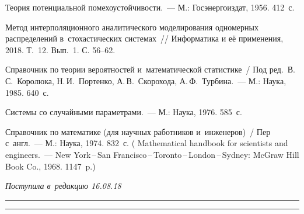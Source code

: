 \begin{multicols}{2}
{{\begin{thebibliography}{9}
Теория потенциальной помехоустойчивости.~--- М.: Госэнергоиздат, 1956. 412~с.

Метод интерполяционного аналитического моделирования одномерных распределений 
в~стохастических системах~// Информатика и её применения, 
2018. Т.~12. Вып.~1. С. 56--62.

\columnbreak

Справочник по теории вероятностей и~математической статистике~/ 
Под ред.\ В.\,С.~Королюка, Н.\,И.~Портенко, А.\,В.~Скорохода, А.\,Ф.~Турбина.~--- 
М.: Наука, 1985. 640~с.



Системы со случайными параметрами.~--- М.:
Наука,  1976.  585~с.


Справочник по  математике (для научных работников и~инженеров)~/
Пер с~англ.~--- 
М.: Наука, 1974. 832~с.
( 
Mathematical handbook for scientists and engineers.~--- 
New York\,--\,San Francisco\,--\,Toronto\,--\,London\,--\,Sydney:
McGraw Hill Book Co., 1968. 1147~p.)
 \end{thebibliography}

 }
 }

\end{multicols}

\vspace*{-9pt}

\hfill{\small\textit{Поступила в~редакцию 16.08.18}}

\vspace*{5pt}




\hrule

\vspace*{2pt}

\hrule


\def\tit{INTERPOLATONAL ANALYTICAL MODELING\\
 IN~COMPLEX STOCHASTIC SYSTEMS}

\def\titkol{Interpolatonal analytical modeling in complex stochastic systems}

\def\aut{I.\,N.~Sinitsyn}

\def\autkol{I.\,N.~Sinitsyn}

